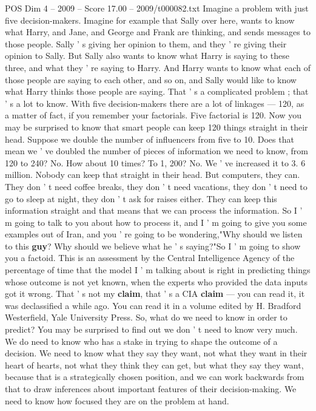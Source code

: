 \begin{textsample}{POS Dim 4 – 2009 – Score 17.00 – 2009/t000082.txt}
Imagine a problem with just five decision-makers.
Imagine for example that Sally over here, wants to know what Harry, and Jane, and George and Frank are thinking, and sends messages to those people.
Sally ' s giving her opinion to them, and they ' re giving their opinion to Sally.
But Sally also wants to know what Harry is saying to these three, and what they ' re saying to Harry.
And Harry wants to know what each of those people are saying to each other, and so on, and Sally would like to know what Harry thinks those people are saying.
That ' s a complicated problem ; that ' s a lot to know.
With five decision-makers there are a lot of linkages — 120, as a matter of fact, if you remember your factorials.
Five factorial is 120.
Now you may be surprised to know that smart people can keep 120 things straight in their head.
Suppose we double the number of influencers from five to 10.
Does that mean we ' ve doubled the number of pieces of information we need to know, from 120 to 240?
No.
How about 10 times?
To 1, 200?
No.
We ' ve increased it to 3. 6 million.
Nobody can keep that straight in their head.
But computers, they can.
They don ' t need coffee breaks, they don ' t need vacations, they don ' t need to go to sleep at night, they don ' t ask for raises either.
They can keep this information straight and that means that we can process the information.
So I ' m going to talk to you about how to process it, and I ' m going to give you some examples out of Iran, and you ' re going to be wondering,"Why should we listen to this \textbf{guy}?
Why should we believe what he ' s saying?"So I ' m going to show you a factoid.
This is an assessment by the Central Intelligence Agency of the percentage of time that the model I ' m talking about is right in predicting things whose outcome is not yet known, when the experts who provided the data inputs got it wrong.
That ' s not my \textbf{claim}, that ' s a CIA \textbf{claim} — you can read it, it was declassified a while ago.
You can read it in a volume edited by H.
Bradford Westerfield, Yale University Press.
So, what do we need to know in order to predict?
You may be surprised to find out we don ' t need to know very much.
We do need to know who has a stake in trying to shape the outcome of a decision.
We need to know what they say they want, not what they want in their heart of hearts, not what they think they can get, but what they say they want, because that is a strategically chosen position, and we can work backwards from that to draw inferences about important features of their decision-making.
We need to know how focused they are on the problem at hand.

\end{textsample}

